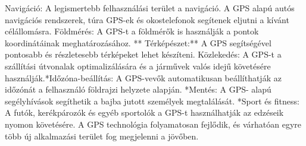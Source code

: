 \documentclass[10pt, conference,a4paper]{ITKproc}
\begin{document}
Navigáció: A legismertebb felhasználási terület a navigáció. A GPS alapú autós navigációs rendszerek, túra GPS-ek és okostelefonok segítenek eljutni a kívánt célállomásra.
Földmérés: A GPS-t a földmérők is használják a pontok koordinátáinak meghatározásához.
** Térképészet:** A GPS segítségével pontosabb és részletesebb térképeket lehet készíteni.
Közlekedés:​ A GPS-t a szállítási útvonalak optimalizálására és a járművek valós idejű követésére használják.
​*Időzóna-beállítás:​ A GPS-vevők automatikusan beállíthatják az időzónát a felhasználó földrajzi helyzete alapján.
​*Mentés:​ A GPS- alapú segélyhívások segíthetik a bajba jutott személyek megtalálását.
​*Sport és fitness:​ A futók, kerékpározók és egyéb sportolók a GPS-t használhatják az edzéseik nyomon követésére.
A GPS technológia folyamatosan fejlődik, és várhatóan egyre több új alkalmazási terület fog megjelenni a jövőben.
\end{document}
